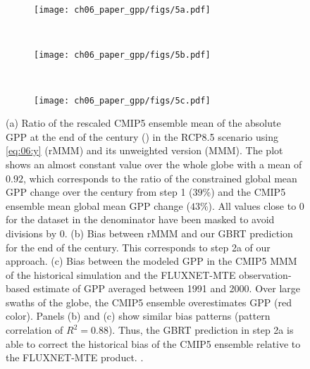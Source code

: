 \begin{figure}[!t]
  \centering
  \begin{subfigure}[b]{\SubfigureWidth{}}
    \texttt{[image: ch06\_paper\_gpp/figs/5a.pdf]}
    \caption{}
    \label{fig:06:step2a_results:a}
  \end{subfigure}
  \\
  \begin{subfigure}[b]{\SubfigureWidth{}}
    \texttt{[image: ch06\_paper\_gpp/figs/5b.pdf]}
    \caption{}
    \label{fig:06:step2a_results:b}
  \end{subfigure}
  ~
  \begin{subfigure}[b]{\SubfigureWidth{}}
    \texttt{[image: ch06\_paper\_gpp/figs/5c.pdf]}
    \caption{}
    \label{fig:06:step2a_results:c}
  \end{subfigure}
  \caption[
    Illustration of our \acl{ML} approach to constrain projected absolute
    \acf{GPP} at the end of the  century with observations in step 2a.
  ]{
    (a) Ratio of the rescaled \acs{CMIP}5 ensemble mean of the absolute
    \acf{GPP} at the end of the  century () in the
    \acs{RCP}8.5 scenario using \cref{eq:06:y} (r\acs{MMM}) and its unweighted
    version (\acs{MMM}). The plot shows an almost constant value over the whole
    globe with a mean of $0.92$, which corresponds to the ratio of the
    constrained global mean \acs{GPP} change over the  century from
    step 1 ($39 \unit{\%}$) and the \acs{CMIP}5 ensemble mean global mean
    \acs{GPP} change ($43 \unit{\%}$). All values close to $0$ for the dataset
    in the denominator have been masked to avoid divisions by $0$. (b) Bias
    between r\acs{MMM} and our \acf{GBRT} prediction for the end of the
     century. This corresponds to step 2a of our approach. (c) Bias
    between the modeled \acs{GPP} in the \acs{CMIP}5 \acs{MMM} of the
    historical simulation and the FLUXNET-MTE observation-based estimate of
    \acs{GPP} \autocite{Jung2011} averaged between 1991 and 2000. Over large
    swaths of the globe, the \acs{CMIP}5 ensemble overestimates \acs{GPP} (red
    color). Panels (b) and (c) show similar bias patterns (pattern correlation
    of $R^2 = 0.88$). Thus, the \acs{GBRT} prediction in step 2a is able to
    correct the historical bias of the \acs{CMIP}5 ensemble relative to the
    FLUXNET-MTE product. .
  }
  \label{fig:06:step2a_results}
\end{figure}

